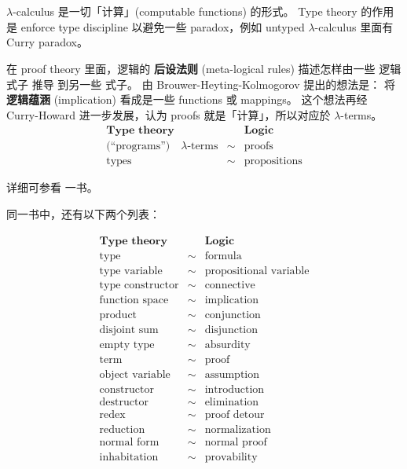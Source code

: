 	\section{}

$\lambda$-calculus 是一切「计算」(computable functions) 的形式。  Type theory 的作用是 enforce type discipline 以避免一些 paradox，例如 untyped $\lambda$-calculus 里面有 Curry paradox。

在 proof theory 里面，逻辑的 \textbf{后设法则} (meta-logical rules) 描述怎样由一些 逻辑式子 推导 到另一些 式子。 由 Brouwer-Heyting-Kolmogorov 提出的想法是： 将 \textbf{逻辑蕴涵} (implication) 看成是一些 functions 或 mappings。 这个想法再经 Curry-Howard 进一步发展，认为 proofs 就是「计算」，所以对应於 $\lambda$-terms。 
\begin{eqnarray}
\textbf{Type theory}                              &      & \textbf{Logic} \nonumber \\
\mbox{(``programs'')} \quad \lambda\mbox{-terms}  & \sim & \mbox{proofs} \nonumber \\
\mbox{types}                                      & \sim & \mbox{propositions}
\end{eqnarray}

详细可参看 \parencite{Sorensen2006} 一书。

同一书中，还有以下两个列表：

\begin{eqnarray}
\textbf{Type theory}        &      & \textbf{Logic} \nonumber \\
\mbox{type} 	 			& \sim & \mbox{formula}	 \nonumber \\ 
\mbox{type variable} 	 	& \sim & \mbox{propositional variable}	 \nonumber \\ 
\mbox{type constructor} 	& \sim & \mbox{connective}	 \nonumber \\ 
\mbox{function space} 	 	& \sim & \mbox{implication}	 \nonumber \\ 
\mbox{product} 	 			& \sim & \mbox{conjunction}	 \nonumber \\ 
\mbox{disjoint sum} 	 	& \sim & \mbox{disjunction}	 \nonumber \\ 
\mbox{empty type} 	 		& \sim & \mbox{absurdity}	 \nonumber \\ 
\mbox{term} 	 			& \sim & \mbox{proof}	 \nonumber \\ 
\mbox{object variable} 	 	& \sim & \mbox{assumption}	 \nonumber \\ 
\mbox{constructor} 	 		& \sim & \mbox{introduction}	 \nonumber \\ 
\mbox{destructor} 	 		& \sim & \mbox{elimination}	 \nonumber \\ 
\mbox{redex} 	 			& \sim & \mbox{proof detour}	 \nonumber \\ 
\mbox{reduction} 	 		& \sim & \mbox{normalization}	 \nonumber \\ 
\mbox{normal form} 	 		& \sim & \mbox{normal proof}	 \nonumber \\ 
\mbox{inhabitation} 		& \sim & \mbox{provability}	
\end{eqnarray}

